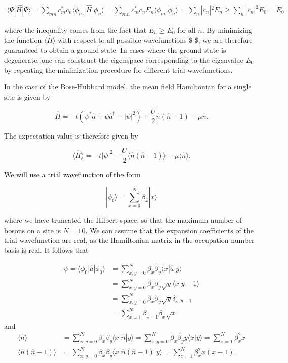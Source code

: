 \documentclass[11pt]{article}
\begin{document}
\begin{align*}
\langle \Psi | \hat H  |\Psi \rangle= \sum_{mn} c_m^* c_n \langle \phi_m | \hat H | \phi_n \rangle =\sum_{mn} c_m^* c_n E_n  \langle  \phi_m | \phi_n \rangle  = \sum_n |c_n|^2 E_n \geq  \sum_n |c_n|^2 E_0 = E_0
\end{align*}

where the inequality comes from the fact that \(E_n \geq E_0\) for all
\(n\). By minimizing the function \(\langle \hat H \rangle\) with
respect to all possible wavefunctions \$ \textbar{} \psi \rangle\$, we
are therefore guaranteed to obtain a ground state. In cases where the
ground state is degenerate, one can construct the eigenspace
corresponding to the eigenvalue \(E_0\) by repeating the minimization
procedure for different trial wavefunctions.

In the case of the Bose-Hubbard model, the mean field Hamiltonian for a
single site is given by

\begin{equation*}
\hat H = - t \left( \psi^* \hat a + \psi \hat a^\dagger - |\psi|^2 \right) + \frac{U}{2}  \hat n (\hat n-1) -\mu \hat n.
\end{equation*}

The expectation value is therefore given by

\begin{equation}
\langle \hat H \rangle = -t |\psi|^2 + \frac{U}{2} \langle \hat n (\hat n-1) \rangle - \mu \langle \hat n \rangle.
\end{equation}

We will use a trial wavefunction of the form

\begin{equation*}
| \phi_0 \rangle = \sum_{x=0}^N \beta_x | x \rangle
\end{equation*}

where we have truncated the Hilbert space, so that the maximum number of
bosons on a site is \(N=10\). We can assume that the expansion
coefficients of the trial wavefunction are real, as the Hamiltonian
matrix in the occupation number basis is real. It follows that

\begin{align*}
\psi  = \langle \phi_0 | \hat a | \phi_0 \rangle &= \sum_{x,y=0}^N  \beta_x \beta_y \langle x | \hat a | y \rangle \\
&= \sum_{x,y=0}^N \beta_x \beta_y \sqrt{y} \langle x | y-1 \rangle \\
&= \sum_{x,y=0}^N \beta_x \beta_y \sqrt{y} \delta_{x,y-1} \\
&=  \sum_{x=1}^{N} \beta_{x-1} \beta_{x} \sqrt{x}
\end{align*} and \begin{align*}
\langle \hat n \rangle &= \sum_{x,y=0}^N  \beta_x \beta_y \langle x | \hat n | y \rangle =  \sum_{x,y=0}^N  \beta_x \beta_y  y  \langle x | y \rangle = \sum_{x=1}^N \beta_x^2 x  \\
\langle \hat n (\hat n-1) \rangle &= \sum_{x,y=0}^N  \beta_x \beta_y \langle x| \hat n (\hat n-1) | y \rangle = \sum_{x=1}^N \beta_x^2 x(x-1).
\end{align*}
\end{document}
